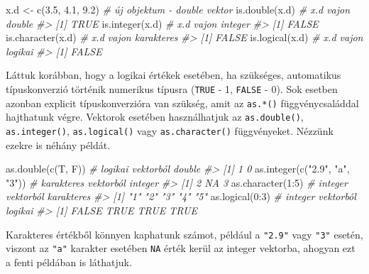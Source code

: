 \documentclass[
]{book}
\newenvironment{Shaded}{\begin{snugshade}}{\end{snugshade}}
\newcommand{\CommentTok}[1]{\textcolor[rgb]{0.56,0.35,0.01}{\textit{#1}}}
\newcommand{\DecValTok}[1]{\textcolor[rgb]{0.00,0.00,0.81}{#1}}
\newcommand{\FloatTok}[1]{\textcolor[rgb]{0.00,0.00,0.81}{#1}}
\newcommand{\FunctionTok}[1]{\textcolor[rgb]{0.00,0.00,0.00}{#1}}
\newcommand{\NormalTok}[1]{#1}
\newcommand{\OtherTok}[1]{\textcolor[rgb]{0.56,0.35,0.01}{#1}}
\newcommand{\SpecialCharTok}[1]{\textcolor[rgb]{0.00,0.00,0.00}{#1}}
\newcommand{\StringTok}[1]{\textcolor[rgb]{0.31,0.60,0.02}{#1}}
\begin{document}
\begin{Shaded}
\begin{Highlighting}[]
\NormalTok{x.d }\OtherTok{\textless{}{-}} \FunctionTok{c}\NormalTok{(}\FloatTok{3.5}\NormalTok{, }\FloatTok{4.1}\NormalTok{, }\FloatTok{9.2}\NormalTok{)  }\CommentTok{\# új objektum {-} double vektor}
\FunctionTok{is.double}\NormalTok{(x.d)           }\CommentTok{\# x.d vajon double}
\CommentTok{\#\textgreater{} [1] TRUE}
\FunctionTok{is.integer}\NormalTok{(x.d)          }\CommentTok{\# x.d vajon integer}
\CommentTok{\#\textgreater{} [1] FALSE}
\FunctionTok{is.character}\NormalTok{(x.d)        }\CommentTok{\# x.d vajon karakteres}
\CommentTok{\#\textgreater{} [1] FALSE}
\FunctionTok{is.logical}\NormalTok{(x.d)          }\CommentTok{\# x.d vajon logikai}
\CommentTok{\#\textgreater{} [1] FALSE}
\end{Highlighting}
\end{Shaded}

Láttuk korábban, hogy a logikai értékek esetében, ha szükséges, automatikus típuskonverzió történik numerikus típusra (\texttt{TRUE} - 1, \texttt{FALSE} - 0). Sok esetben azonban explicit típuskonverzióra van szükség, amit az \texttt{as.*()} függvénycsaláddal hajthatunk végre. Vektorok esetében használhatjuk az \texttt{as.double()}, \texttt{as.integer()}, \texttt{as.logical()} vagy \texttt{as.character()} függvényeket. Nézzünk ezekre is néhány példát.

\begin{Shaded}
\begin{Highlighting}[]
\FunctionTok{as.double}\NormalTok{(}\FunctionTok{c}\NormalTok{(T, F))              }\CommentTok{\# logikai vektorból double }
\CommentTok{\#\textgreater{} [1] 1 0}
\FunctionTok{as.integer}\NormalTok{(}\FunctionTok{c}\NormalTok{(}\StringTok{"2.9"}\NormalTok{, }\StringTok{"a"}\NormalTok{, }\StringTok{"3"}\NormalTok{))  }\CommentTok{\# karakteres vektorból integer}
\CommentTok{\#\textgreater{} [1]  2 NA  3}
\FunctionTok{as.character}\NormalTok{(}\DecValTok{1}\SpecialCharTok{:}\DecValTok{5}\NormalTok{)               }\CommentTok{\# integer vektorból karakteres           }
\CommentTok{\#\textgreater{} [1] "1" "2" "3" "4" "5"}
\FunctionTok{as.logical}\NormalTok{(}\DecValTok{0}\SpecialCharTok{:}\DecValTok{3}\NormalTok{)                 }\CommentTok{\# integer vektorból logikai}
\CommentTok{\#\textgreater{} [1] FALSE  TRUE  TRUE  TRUE}
\end{Highlighting}
\end{Shaded}

Karakteres értékből könnyen kaphatunk számot, például a \texttt{"2.9"} vagy \texttt{"3"} esetén, viszont az \texttt{"a"} karakter esetében \texttt{NA} érték kerül az integer vektorba, ahogyan ezt a fenti példában is láthatjuk.
\end{document}
